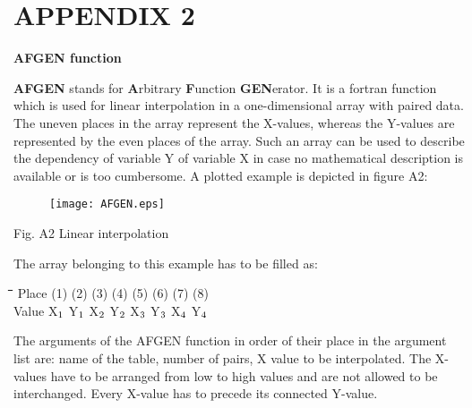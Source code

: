 \documentclass[11pt]{article}
\begin{document}
\setcounter{page}{122}\pagenumpos{\pnbr}
\section{  APPENDIX 2  } 

\bigskip
{\bf {\large AFGEN function}}

{\bf AFGEN} stands for {\bf A}rbitrary {\bf F}unction {\bf GEN}erator. It is a fortran function which is used for
linear interpolation in a one-dimensional array with paired data. The uneven places in the
array represent the X-values, whereas the Y-values are represented by the even places of the
array. Such an array can be used to describe the dependency of variable Y of variable X in
case no mathematical description is available or is too cumbersome. A plotted example is
depicted in figure A2:

\begin{figure}[htbp]
 \begin{center}\texttt{[image: AFGEN.eps]} \end{center}
\end{figure}

\bigskip
\bigskip
\bigskip
\bigskip
\bigskip
\bigskip
\bigskip
\bigskip
\bigskip
\bigskip
\bigskip
\bigskip
\bigskip
\bigskip
\bigskip
\bigskip
\nwln
\begin{center}
Fig. A2 Linear interpolation
\end{center}

 \bigskip
The array belonging to this example has to be filled as: \nwln
\begin{tabbing}
\hspace{1.27cm}\=\hspace{1.27cm}\=\hspace{1.27cm}\=\hspace{1.27cm}\=%
\hspace{1.27cm}\=\hspace{1.27cm}\=\hspace{1.27cm}\=\hspace{1.27cm}\=%
\hspace{1.27cm}\=\hspace{1.27cm}\=\kill
\>\> Place\> (1)\> (2)\> (3)\> (4)\> (5)\> (6)\> (7)\> (8)\\
\>\> Value\> X$_{{\rm 1}}$ \> Y$_{{\rm 1}}$   \> X$_{{\rm 2}}$\> Y$_{{\rm 2}}$   \> X$_{{\rm 3}}$ \> Y$_{{\rm 3}}$   \> X$_{{\rm 4}}$ \> Y$_{{\rm 4}}$
\end{tabbing}

 \bigskip
The arguments of the AFGEN function in order of their place in the argument list are: name
of the table, number of pairs, X value to be interpolated. The X-values have to be arranged
from low to high values and are not allowed to be interchanged. Every X-value has to
precede its connected Y-value.
\end{document}
